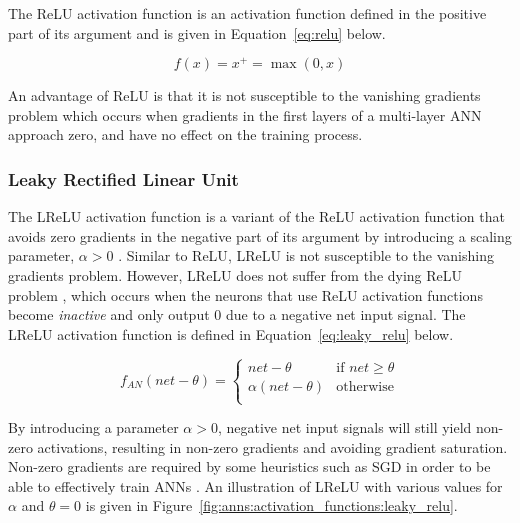 The \acf{ReLU} activation function is an activation function defined in the positive part of its argument and is given in Equation~\eqref{eq:relu} below.

\begin{equation}
    f(x) = x^{+} = \max(0,x)
    \label{eq:relu}
\end{equation}

\noindent
An advantage of \acs{ReLU} is that it is not susceptible to the vanishing gradients problem \cite{ref:xu:2015, ref:maksutov:2018} which occurs when gradients in the first layers of a multi-layer \acs{ANN} approach zero, and have no effect on the training process.


\subsubsection{Leaky Rectified Linear Unit}\label{sec:anns:an:act_functions:leaky_relu}

The \acf{LReLU} activation function is a variant of the \acs{ReLU} activation function that avoids zero gradients in the negative part of its argument by introducing a scaling parameter, $\alpha > 0$ \cite{ref:xu:2015}. Similar to \acs{ReLU}, \acs{LReLU} is not susceptible to the vanishing gradients problem. However, \acs{LReLU} does not suffer from the dying \acs{ReLU} problem \cite{ref:agarap:2018}, which occurs when the neurons that use \acs{ReLU} activation functions become \textit{inactive} and only output $0$ due to a negative net input signal. The \acs{LReLU} activation function is defined in Equation~\eqref{eq:leaky_relu} below.

\begin{equation}
    f_{AN}(net - \theta) =
    \begin{cases}
        net - \theta         & \text{if $net \geq \theta $} \\
        \alpha(net - \theta) & \text{otherwise}             \\
    \end{cases}
    \label{eq:leaky_relu}
\end{equation}

\noindent
By introducing a parameter $\alpha > 0$, negative net input signals will still yield non-zero activations, resulting in non-zero gradients and avoiding gradient saturation. Non-zero gradients are required by some heuristics such as \acs{SGD} in order to be able to effectively train \acp{ANN} \cite{ref:hanin:2018}. An illustration of \acs{LReLU} with various values for $\alpha$ and $\theta = 0$ is given in Figure~\ref{fig:anns:activation_functions:leaky_relu}.

